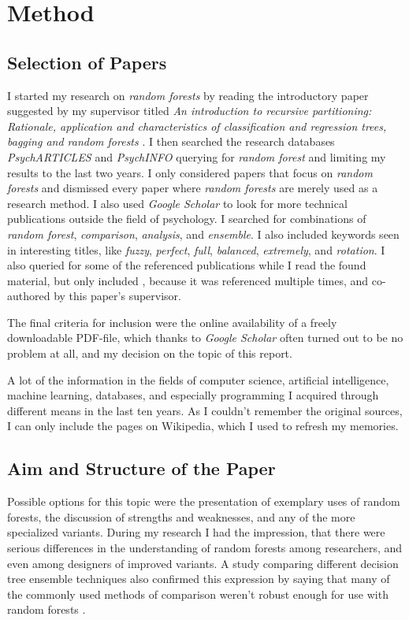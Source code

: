 \documentclass[a4paper,man,12pt,apacite]{apa6} %
\begin{document}

\section{Method}

\subsection{Selection of Papers}
I started my research on \emph{random forests} by reading the
introductory paper suggested by my supervisor titled
\emph{An introduction to recursive partitioning: Rationale, application
and characteristics of classification and regression trees, bagging and
random forests} \cite{strobl2009introduction}.
I then searched the research databases \emph{PsychARTICLES} and
\emph{PsychINFO} querying for \emph{random forest} and limiting my results
to the last two years.
I only considered papers that focus on \emph{random forests} and
dismissed every paper where \emph{random forests} are merely used as a
research method.
I also used \emph{Google Scholar} to look for more technical
publications outside the field of psychology.
I searched for combinations of \emph{random forest}, \emph{comparison},
\emph{analysis}, and \emph{ensemble}.
I also included keywords seen in interesting titles, like \emph{fuzzy},
\emph{perfect}, \emph{full}, \emph{balanced}, \emph{extremely}, and
\emph{rotation}.
I also queried for some of the referenced publications while I read the
found material, but only included \cite{strobl2008conditional}, because
it was referenced multiple times, and co-authored by this paper's
supervisor.

The final criteria for inclusion were the online availability of a freely
downloadable PDF-file, which thanks to \emph{Google Scholar} often turned
out to be no problem at all, and my decision on the topic of
this report.

A lot of the information in the fields of computer science, artificial
intelligence, machine learning, databases, and especially programming
I acquired through different means in the last ten years.
As I couldn't remember the original sources, I can only include the pages
on Wikipedia, which I used to refresh my memories.

\subsection{Aim and Structure of the Paper}
Possible options for this topic were the presentation of
exemplary uses of random
forests, the discussion of strengths and weaknesses, and any of the more
specialized variants.
During my research I had the impression, that there were serious
differences in the understanding of random forests among researchers,
and even among designers of improved variants.
A study comparing different decision tree ensemble techniques also confirmed
this expression by saying that many of the commonly used methods of comparison
weren't robust enough for use with random forests \cite{banfield2007comparison}.
\end{document}
